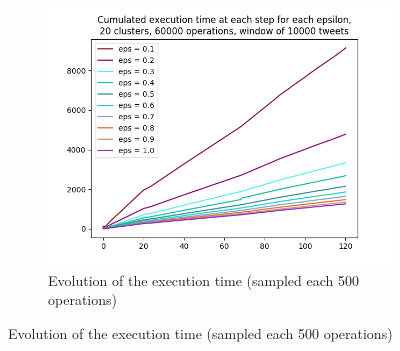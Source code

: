 \documentclass[a4paper,10pt]{article}
\begin{document}
\begin{appendices}
\begin{figure}[h]
\begin{subfigure}[b]{0.3\textwidth}
		\includegraphics[width=\textwidth]{pictures/cumulated_execution_times_20_60000_10000.png}
		\caption{Evolution of the execution time (sampled each 500 operations)}
	\end{subfigure}
	

\end{figure}
\end{appendices}
\end{document}
